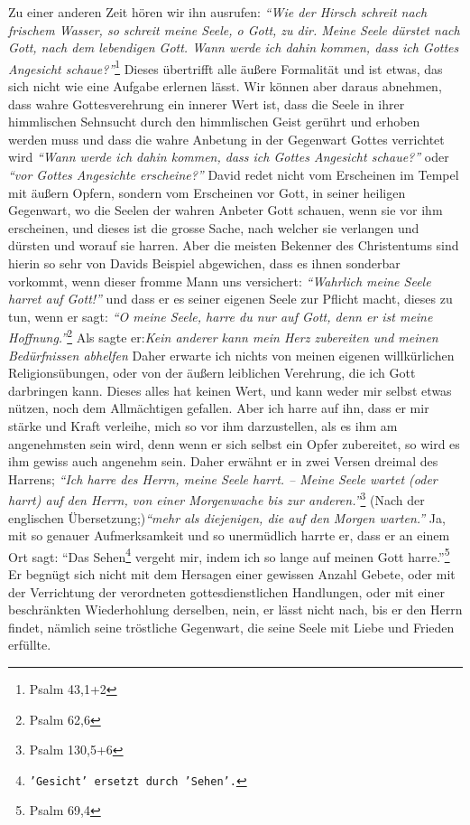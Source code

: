   Zu einer anderen Zeit hören wir ihn
ausrufen:
\textit{"`Wie der Hirsch schreit nach
frischem Wasser, so schreit meine Seele, o Gott, zu dir. Meine Seele dürstet
nach Gott, nach dem lebendigen Gott. Wann werde ich dahin kommen, dass ich
Gottes Angesicht schaue?"'}\footnote{Psalm 43,1+2}
Dieses übertrifft alle äußere
Formalität  und ist etwas, das sich nicht wie eine
Aufgabe erlernen lässt. Wir
können aber daraus abnehmen, dass wahre Gottesverehrung ein innerer Wert ist,
dass die Seele in ihrer himmlischen Sehnsucht durch den himmlischen Geist
gerührt und erhoben werden muss und dass die wahre Anbetung in der Gegenwart
Gottes verrichtet wird
\textit{"`Wann werde ich dahin kommen, dass ich Gottes
Angesicht schaue?"'} oder \textit{"`vor Gottes Angesichte erscheine?"'} David
redet nicht
vom Erscheinen im Tempel  mit äußern Opfern, sondern
vom Erscheinen vor Gott, in
seiner heiligen Gegenwart, wo die Seelen der wahren Anbeter Gott schauen, wenn
sie vor ihm erscheinen, und dieses ist die grosse Sache, nach welcher sie
verlangen und dürsten und worauf sie harren. Aber die meisten Bekenner des
Christentums sind hierin so sehr von Davids Beispiel abgewichen, dass es ihnen
sonderbar vorkommt, wenn dieser fromme Mann uns versichert:
\textit{"`Wahrlich meine Seele harret auf Gott!"'}
und dass er es seiner eigenen Seele zur Pflicht macht,
dieses zu tun, wenn er sagt:
\textit{"`O meine Seele, harre du nur auf Gott, denn er ist meine
Hoffnung."'}\footnote{Psalm 62,6}
Als sagte er:\textit{Kein anderer kann mein Herz
zubereiten und meinen Bedürfnissen abhelfen} Daher erwarte ich nichts von meinen
eigenen willkürlichen Religionsübungen,
oder von der äußern leiblichen
Verehrung, die ich Gott darbringen kann. Dieses alles hat keinen Wert, und kann
weder mir selbst etwas nützen, noch dem Allmächtigen gefallen. Aber ich
harre auf ihn, dass er mir stärke und Kraft verleihe, mich so vor ihm
darzustellen, als es ihm am angenehmsten sein wird, denn wenn er sich selbst ein
Opfer  zubereitet, so wird es ihm gewiss auch angenehm
sein. Daher erwähnt er in
zwei Versen dreimal des Harrens;
\textit{"`Ich harre des Herrn, meine Seele harrt. --
Meine Seele wartet (oder harrt) auf den Herrn, von einer Morgenwache bis zur
anderen."'}\footnote{Psalm 130,5+6}
(Nach der englischen Übersetzung;)\textit{"`mehr als
diejenigen, die auf den Morgen warten."'} Ja, mit so genauer Aufmerksamkeit und
so unermüdlich harrte er, dass er an einem Ort sagt:
"`Das Sehen\footnote{\texttt{'Gesicht' ersetzt durch 'Sehen'.}} vergeht mir,
indem ich so lange auf meinen Gott harre."'\footnote{Psalm 69,4}
Er begnügt sich
nicht mit dem Hersagen einer gewissen Anzahl Gebete,
oder mit der Verrichtung
der verordneten gottesdienstlichen Handlungen, oder mit einer beschränkten
Wiederhohlung derselben, nein, er lässt nicht nach, bis er den Herrn findet,
nämlich seine tröstliche Gegenwart, die seine Seele mit Liebe und Frieden
erfüllte.

